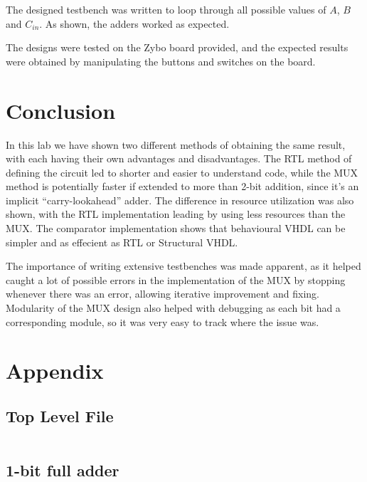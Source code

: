 \documentclass{article}
\begin{document}
The designed testbench was written to loop through all possible values of $A$, $B$ and $C_{in}$.
As shown, the adders worked as expected.

The designs were tested on the Zybo board provided, and the expected results were obtained by manipulating the buttons and switches on the board.

\section{Conclusion}

In this lab we have shown two different methods of obtaining the same result, with each having their own advantages and disadvantages.
The RTL method of defining the circuit led to shorter and easier to understand code, while the MUX method is potentially faster if
extended to more than 2-bit addition, since it's an implicit ``carry-lookahead'' adder.
The difference in resource utilization was also shown, with the RTL implementation leading by using less resources than the MUX.\@
The comparator implementation shows that behavioural VHDL can be simpler and as effecient as RTL or Structural VHDL.\@

The importance of writing extensive testbenches was made apparent, as it helped caught a lot of possible errors in the
implementation of the MUX by stopping whenever there was an error, allowing iterative improvement and fixing.
Modularity of the MUX design also helped with debugging as each bit had a corresponding module, so it was very easy to track where the issue was.


\pagebreak
\section*{Appendix}

\subsection{Top Level File}
\inputminted{vhdl}{../src/lab1_top.vhd}

\pagebreak
\subsection{1-bit full adder}
\inputminted{vhdl}{../src/full_adder_1bit.vhd}
\end{document}
